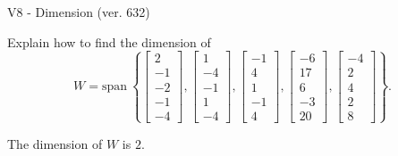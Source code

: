 \begin{exercise}
  \begin{exerciseTitle}V8 - Dimension (ver. 632)\end{exerciseTitle}
  \begin{exerciseStatement}
    Explain how to find the dimension of 
\[W=\mathrm{span}\ \left\{\left[\begin{array}{r}
2 \\
-1 \\
-2 \\
-1 \\
-4
\end{array}\right] , \left[\begin{array}{r}
1 \\
-4 \\
-1 \\
1 \\
-4
\end{array}\right] , \left[\begin{array}{r}
-1 \\
4 \\
1 \\
-1 \\
4
\end{array}\right] , \left[\begin{array}{r}
-6 \\
17 \\
6 \\
-3 \\
20
\end{array}\right] , \left[\begin{array}{r}
-4 \\
2 \\
4 \\
2 \\
8
\end{array}\right]\right\}.\]



  \end{exerciseStatement}
  \begin{exerciseAnswer}
   The dimension of \(W\) is  \(2\).
  


  \end{exerciseAnswer}
\end{exercise}